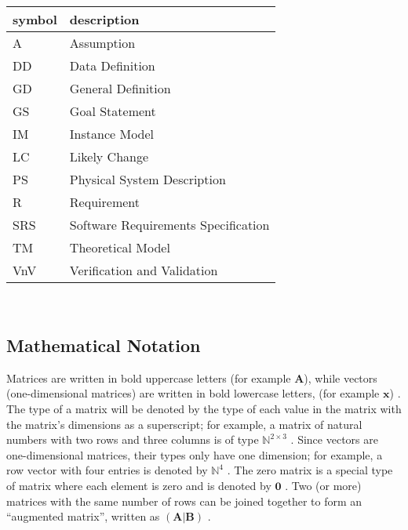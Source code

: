 \documentclass[12pt]{article}
\begin{document}
\renewcommand{\arraystretch}{1.2}
\begin{tabular}{l l}
  \toprule
  \textbf{symbol} & \textbf{description}                \\
  \midrule
  A               & Assumption                          \\
  DD              & Data Definition                     \\
  GD              & General Definition                  \\
  GS              & Goal Statement                      \\
  IM              & Instance Model                      \\
  LC              & Likely Change                       \\
  PS              & Physical System Description         \\
  R               & Requirement                         \\
  SRS             & Software Requirements Specification \\
  TM              & Theoretical Model                   \\
  VnV             & Verification and Validation         \\
  \bottomrule
\end{tabular}\\

\subsection{Mathematical Notation} \label{sec_mathNot}

Matrices are written in bold uppercase letters (for example $\textbf{A}$), while
vectors (one-dimensional matrices) are written in bold lowercase letters, (for
example
$\textbf{x}$) \cite{osullivan_appendix_2010}. The type of a matrix will be
denoted by the type of each value in the matrix with the matrix's dimensions
as a superscript; for example, a matrix of natural numbers with two rows and
three columns is of type $\mathbb{N}^{2 \times 3}$
\cite[p.~3]{golub_matrix_2013}. Since vectors are one-dimensional
matrices, their types only have one dimension; for example, a row vector with
four entries is denoted by $\mathbb{N}^{4}$ \cite[p.~4]{golub_matrix_2013}.
The zero matrix is a special
type of matrix where each element is zero and is denoted by $\textbf{0}$
\cite{weisstein_zero_2023}.
Two (or more) matrices with the same
number of rows can be joined together to form an ``augmented matrix'', written
as $\left(\textbf{A}\vert \textbf{B}\right)$ \cite{taboga_augmented_2021}.
\end{document}
